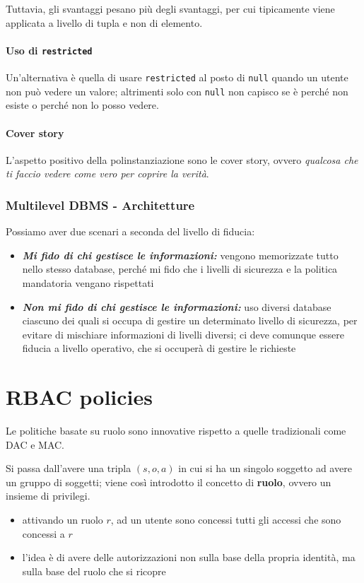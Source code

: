 \documentclass{report}
\begin{document}
\noindent Tuttavia, gli svantaggi pesano più degli svantaggi, per cui tipicamente viene applicata a 
livello di tupla e non di elemento.

\subsubsection{Uso di \texttt{restricted}}

\noindent Un'alternativa è quella di usare \texttt{restricted} al posto di \texttt{null} quando 
un utente non può vedere un valore; altrimenti solo con \texttt{null} non capisco se è perché non esiste 
o perché non lo posso vedere.

\subsubsection{Cover story}
L'aspetto positivo della polinstanziazione sono le cover story, ovvero \textit{qualcosa che ti faccio 
vedere come vero per coprire la verità}.

\subsection{Multilevel DBMS - Architetture}
Possiamo aver due scenari a seconda del livello di fiducia:
\begin{itemize}
    \item \textbf{\textit{Mi fido di chi gestisce le informazioni:}} vengono memorizzate 
    tutto nello stesso database, perché mi fido che i livelli di sicurezza e 
    la politica mandatoria vengano rispettati
    \item \textbf{\textit{Non mi fido di chi gestisce le informazioni:}} uso diversi database
    ciascuno dei quali si occupa di gestire un determinato livello di sicurezza, per evitare di 
    mischiare informazioni di livelli diversi; ci deve comunque essere fiducia a livello operativo,
    che si occuperà di gestire le richieste
\end{itemize}




\chapter{RBAC policies}
Le politiche basate su ruolo sono innovative rispetto a quelle tradizionali come DAC e MAC.

\noindent Si passa dall'avere una tripla $(s,o,a)$ in cui si ha un singolo soggetto ad avere un gruppo 
di soggetti; viene così introdotto il concetto di \textbf{ruolo}, ovvero un insieme di privilegi.
\begin{itemize}
    \item attivando un ruolo $r$, ad un utente sono concessi tutti gli accessi che sono concessi a $r$
    \item l'idea è di avere delle autorizzazioni non sulla base della propria identità, ma sulla base 
    del ruolo che si ricopre
\end{itemize}
\end{document}
